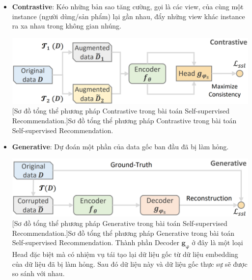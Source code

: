 \begin{itemize}
    \item[] \textbf{Contrastive}: Kéo những bản sao tăng cường, gọi là các view, của cùng một instance (người dùng/sản phẩm) lại gần nhau, đẩy những view khác instance ra xa nhau trong không gian nhúng.\\
    \begin{minipage}{\linewidth}
        \vspace*{+5mm}
        \centering
        \includegraphics[scale=0.3]{images/Chapter3/contras_ssr.png}
        [Sơ đồ tổng thể phương pháp Contrastive trong bài toán Self-supervised Recommendation.]{Sơ đồ tổng thể phương pháp Contrastive trong bài toán Self-supervised Recommendation.}
    \end{minipage}
    
    \item[] \textbf{Generative}: Dự đoán một phần của data gốc ban đầu đã bị làm hỏng.\\
    \begin{minipage}{\linewidth}
        \vspace*{+5mm}
        \centering
        \includegraphics[scale=0.3]{images/Chapter3/gen_ssr.png}
        [Sơ đồ tổng thể phương pháp Generative trong bài toán Self-supervised Recommendation.]{Sơ đồ tổng thể phương pháp Generative trong bài toán Self-supervised Recommendation. Thành phần Decoder $\bm{g_\varphi}$ ở đây là một loại Head đặc biệt mà có nhiệm vụ tái tạo lại dữ liệu gốc từ dữ liệu embedding của dữ liệu đã bị làm hỏng. Sau đó dữ liệu này và dữ liệu gốc thực sự sẽ được so sánh với nhau.}
    \end{minipage}
    

\end{itemize}
